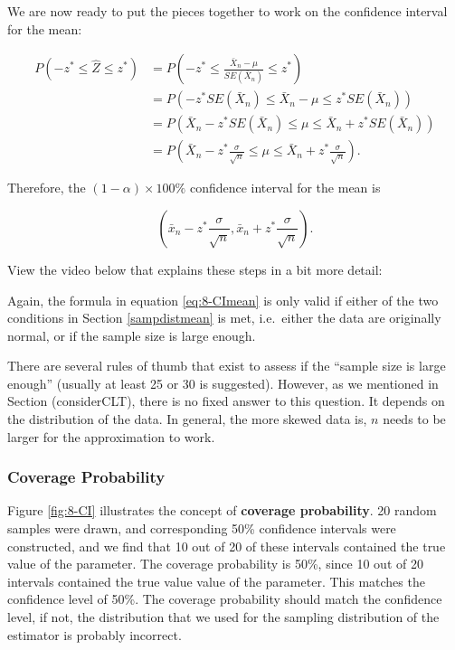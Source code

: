 \documentclass[
]{book}
\begin{document}
We are now ready to put the pieces together to work on the confidence interval for the mean:

\begin{equation} 
\begin{split}
P(-z^{*} \leq \hat{Z} \leq z^{*}) &= P(-z^{*} \leq \frac{\bar{X}_n - \mu}{SE(\bar{X}_n)} \leq z^{*}) \\
                                  &= P\left(-z^{*}SE(\bar{X}_n) \leq \bar{X}_n - \mu \leq z^{*}SE(\bar{X}_n)\right) \\
                                  &= P\left(\bar{X}_n - z^{*}SE(\bar{X}_n) \leq \mu \leq \bar{X}_n + z^{*}SE(\bar{X}_n)\right) \\
                                  &= P\left(\bar{X}_n - z^{*} \frac{\sigma}{\sqrt{n}} \leq \mu \leq \bar{X}_n + z^{*} \frac{\sigma}{\sqrt{n}}\right).
\end{split}
\label{eq:8-CImeanwork}
\end{equation}

Therefore, the \((1-\alpha) \times 100\%\) confidence interval for the mean is

\begin{equation} 
\left( \bar{x}_n - z^{*} \frac{\sigma}{\sqrt{n}}, \bar{x}_n + z^{*} \frac{\sigma}{\sqrt{n}} \right).
\label{eq:8-CImean}
\end{equation}

View the video below that explains these steps in a bit more detail:

Again, the formula in equation \eqref{eq:8-CImean} is only valid if either of the two conditions in Section \ref{sampdistmean} is met, i.e.~either the data are originally normal, or if the sample size is large enough.

There are several rules of thumb that exist to assess if the ``sample size is large enough'' (usually at least 25 or 30 is suggested). However, as we mentioned in Section (considerCLT), there is no fixed answer to this question. It depends on the distribution of the data. In general, the more skewed data is, \(n\) needs to be larger for the approximation to work.

\hypertarget{CP}{%
\subsubsection{Coverage Probability}\label{CP}}

Figure \ref{fig:8-CI} illustrates the concept of \textbf{coverage probability}. 20 random samples were drawn, and corresponding 50\% confidence intervals were constructed, and we find that 10 out of 20 of these intervals contained the true value of the parameter. The coverage probability is 50\%, since 10 out of 20 intervals contained the true value value of the parameter. This matches the confidence level of 50\%. The coverage probability should match the confidence level, if not, the distribution that we used for the sampling distribution of the estimator is probably incorrect.
\end{document}
